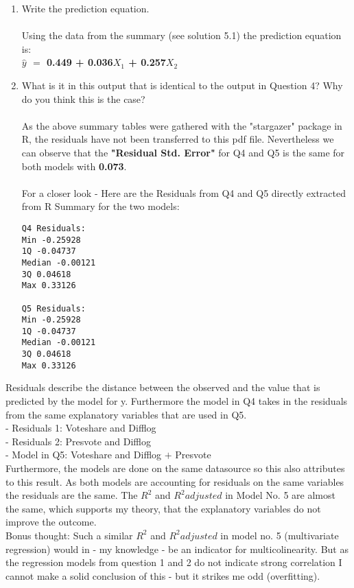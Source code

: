 \documentclass[12pt,letterpaper]{article}
\begin{document}
\begin{enumerate}
		\vspace{1cm}
		\item Write the prediction equation.\\\\
Using the data from the summary (see solution 5.1) the prediction equation is:\\
\textbf{$\hat{y}$ $=$ 0.449 + 0.036$X_1$ + 0.257$X_2$}

		
		\vspace{5cm}
		\item What is it in this output that is identical to the output in Question 4? Why do you think this is the case?\\\\
		As the above summary tables were gathered with the "stargazer" package in R, the residuals have not been transferred to this pdf file. Nevertheless we can observe that the \textbf{"Residual Std. Error"} for Q4 and Q5 is the same for both models with \textbf{0.073}.\\\\
		For a closer look - Here are the Residuals from Q4 and Q5 directly extracted from R Summary for the two models:
		\begin{verbatim}
Q4 Residuals:     
Min -0.25928       
1Q -0.04737  
Median -0.00121    
3Q 0.04618  
Max 0.33126 
			
Q5 Residuals:
Min -0.25928
1Q -0.04737
Median -0.00121
3Q 0.04618
Max 0.33126 
\end{verbatim}
\end{enumerate}
Residuals describe the distance between the observed and the value that is predicted by the model for y. Furthermore the model in Q4 takes in the residuals from the same explanatory variables that are used in Q5.\\
- Residuals 1: Voteshare and Difflog\\
- Residuals 2: Presvote and Difflog\\
- Model in Q5: Voteshare and Difflog $+$ Presvote\\

Furthermore, the models are done on the same datasource so this also attributes to this result. As both models are accounting for residuals on the same variables the residuals are the same. The $R^2$ and $R^2 adjusted$  in Model No. 5 are almost the same, which supports my theory, that the explanatory variables do not improve the outcome. \\

Bonus thought: Such a similar $R^2$ and $R^2 adjusted$ in model no. 5 (multivariate regression) would in - my knowledge - be an indicator for multicolinearity. But as the regression models from question 1 and 2 do not indicate strong correlation I cannot make a solid conclusion of this - but it strikes me odd (overfitting).
			
\end{document}
